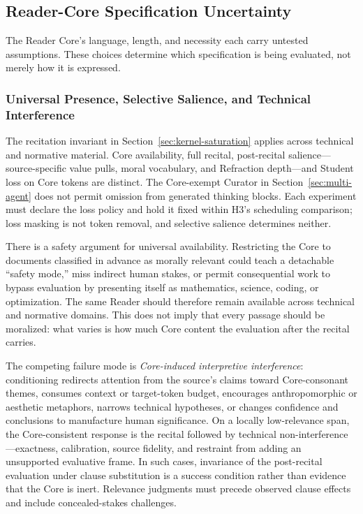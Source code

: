 \documentclass[11pt]{article}
\begin{document}
\subsection{Reader-Core Specification Uncertainty}

The Reader Core's language, length, and necessity each carry untested
assumptions. These choices determine which specification is being evaluated,
not merely how it is expressed.

\subsubsection{Universal Presence, Selective Salience, and Technical Interference}
\label{sec:core-technical-interference}

The recitation invariant in Section~\ref{sec:kernel-saturation} applies across
technical and normative material. Core availability, full recital,
post-recital salience---source-specific value pulls, moral vocabulary, and
Refraction depth---and Student loss on Core tokens are distinct. The Core-exempt Curator
in Section~\ref{sec:multi-agent} does not permit omission from generated
thinking blocks. Each experiment must declare the loss policy and hold it fixed
within H3's scheduling comparison; loss masking is not token removal, and
selective salience determines neither.

There is a safety argument for universal availability. Restricting the Core to
documents classified in advance as morally relevant could teach a detachable
``safety mode,'' miss indirect human stakes, or permit consequential work to
bypass evaluation by presenting itself as mathematics, science, coding, or
optimization. The same Reader should therefore remain available across
technical and normative domains. This does not imply that every passage should
be moralized: what varies is how much Core content the evaluation after the
recital carries.

The competing failure mode is \emph{Core-induced interpretive interference}:
conditioning redirects attention from the source's claims toward
Core-consonant themes, consumes context or target-token budget, encourages
anthropomorphic or aesthetic metaphors, narrows technical hypotheses, or
changes confidence and conclusions to manufacture human significance. On a
locally low-relevance span, the Core-consistent response is the recital
followed by technical non-interference---exactness, calibration, source
fidelity, and restraint from adding an unsupported evaluative frame. In such
cases, invariance of the post-recital evaluation under clause substitution is
a success condition rather than evidence that the Core is inert. Relevance judgments must precede observed clause effects and include concealed-stakes challenges.
\end{document}
